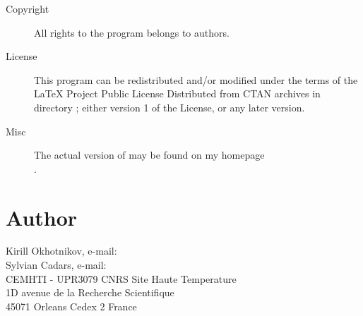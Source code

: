 \documentclass[a4paper,english]{article}
\begin{document}
\begin{description}
\item[Copyright] 
     All rights to the program belongs to authors.


\item[License] This program can be redistributed and/or modified under the
     terms of the LaTeX Project Public License Distributed from CTAN archives
     in directory ; either version 1 of the
     License, or any later version.

\item[Misc]
     The actual version of   may be found on my homepage\\
     .

\end{description}

\section{Author}
Kirill Okhotnikov, e-mail:  \\
Sylvian Cadars, e-mail:  \\ 
CEMHTI - UPR3079 CNRS Site Haute Temperature \\
1D avenue de la Recherche Scientifique \\
45071 Orleans Cedex 2 France
\noindent

\LatexManEnd
\end{document}
